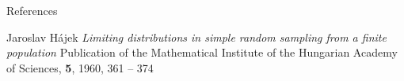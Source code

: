 
\begin{frame}{\Huge References}

{\LARGE Jaroslav H\'{a}jek
\vskip 0.3cm
\Large
\textit{Limiting distributions in simple random sampling from a finite population}
\vskip 0.3cm
Publication of the Mathematical Institute of the Hungarian Academy of Sciences,
\textbf{5}, 1960, 361 -- 374
}

\end{frame}
\normalsize

